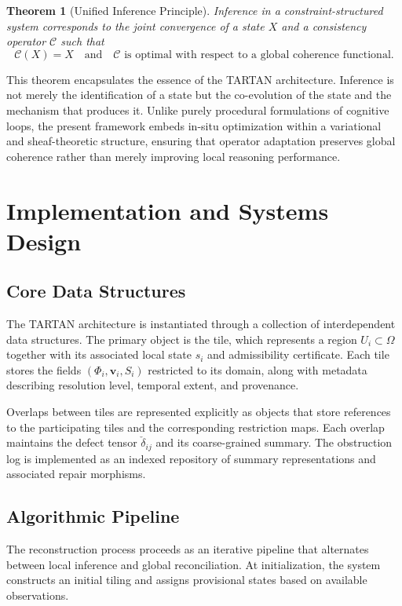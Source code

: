 \documentclass[12pt, oneside]{article}
\newtheorem{theorem}{Theorem}
\begin{document}
\begin{theorem}[Unified Inference Principle]
Inference in a constraint-structured system corresponds to the joint convergence of a state $X$ and a consistency operator $\mathcal{C}$ such that
\[
\mathcal{C}(X) = X \quad \text{and} \quad \mathcal{C} \text{ is optimal with respect to a global coherence functional.}
\]
\end{theorem}

This theorem encapsulates the essence of the TARTAN architecture. Inference is not merely the identification of a state but the co-evolution of the state and the mechanism that produces it. Unlike purely procedural formulations of cognitive loops, the present framework embeds in-situ optimization within a variational and sheaf-theoretic structure, ensuring that operator adaptation preserves global coherence rather than merely improving local reasoning performance.

\section{Implementation and Systems Design}

\subsection{Core Data Structures}

The TARTAN architecture is instantiated through a collection of interdependent data structures. The primary object is the tile, which represents a region $U_i \subset \Omega$ together with its associated local state $s_i$ and admissibility certificate. Each tile stores the fields $(\Phi_i, \mathbf{v}_i, S_i)$ restricted to its domain, along with metadata describing resolution level, temporal extent, and provenance.

Overlaps between tiles are represented explicitly as objects that store references to the participating tiles and the corresponding restriction maps. Each overlap maintains the defect tensor $\check{\delta}_{ij}$ and its coarse-grained summary. The obstruction log is implemented as an indexed repository of summary representations and associated repair morphisms.

\subsection{Algorithmic Pipeline}

The reconstruction process proceeds as an iterative pipeline that alternates between local inference and global reconciliation. At initialization, the system constructs an initial tiling and assigns provisional states based on available observations.
\end{document}
